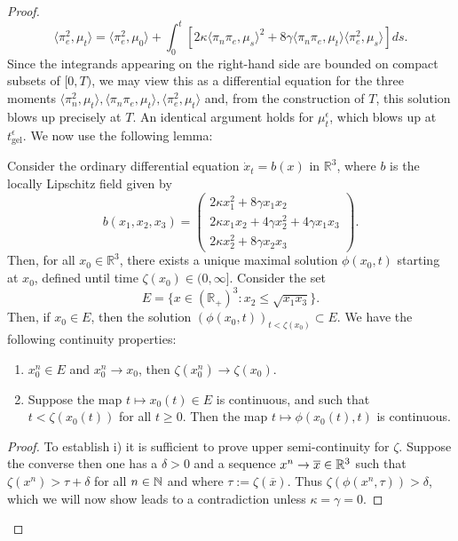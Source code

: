 \begin{proof}
\begin{equation}
    \langle \pi_e^2, \mu_t\rangle =
    \langle \pi_e^2, \mu_0\rangle + \int_0^t \left[2\kappa\langle \pi_n\pi_e, \mu_s\rangle^2+8\gamma\langle \pi_n\pi_e, \mu_t\rangle\langle\pi_e^2, \mu_s \rangle \right] ds.
\end{equation} Since the integrands appearing on the right-hand side are bounded on compact subsets of $[0,T)$, we may view this as a differential equation for the three moments $\langle \pi_n^2, \mu_t\rangle, \langle \pi_n \pi_e, \mu_t\rangle, \langle \pi_e^2, \mu_t\rangle$ and, from the construction of $T$, this solution blows up precisely at $T$. An identical argument holds for $\mu^\epsilon_t$, which blows up at $t^\epsilon_\mathrm{gel}$. We now use the following lemma:
\begin{lemma} Consider the ordinary differential equation $\dot{x}_t=b(x)$ in $\mathbb{R}^3$, where $b$ is the locally Lipschitz field given by \begin{equation} \label{eq: system of ODEs} b(x_1,x_2,x_3)=\begin{pmatrix}2\kappa x_1^2+8\gamma x_1x_2 \\ 2\kappa x_1x_2+4\gamma x_2^2+4\gamma x_1x_3 \\ 2\kappa x_2^2 + 8\gamma x_2x_3 \end{pmatrix}. \end{equation} Then, for all $x_0\in \mathbb{R}^3$, there exists a unique maximal solution $\phi(x_0, t)$ starting at $x_0$, defined until time $\zeta(x_0)\in (0, \infty]$. Consider the set \begin{equation} E=\{x\in (\mathbb{R}_+)^3: x_2\le \sqrt{x_1x_3}\}.\end{equation} Then, if $x_0 \in E$, then the solution $(\phi(x_0,t))_{t<\zeta(x_0)} \subset E$. We have the following continuity properties: \begin{enumerate}[label=\roman{*}).] \item $x^n_0 \in E$ and $x^n_0 \rightarrow x_0$, then $\zeta(x^n_0)\rightarrow \zeta(x_0).$ \item Suppose the map $t\mapsto x_0(t) \in E$ is continuous, and such that $t<\zeta(x_0(t))$ for all $t\ge 0.$ Then the map $t\mapsto \phi(x_0(t), t)$ is continuous.  \end{enumerate} \end{lemma} 

\begin{proof}
To establish i) it is sufficient to prove upper semi-continuity for $\zeta$.
Suppose the converse then one has a $\delta>0$ and a sequence $x^n \rightarrow \overline{x} \in \mathbb{R}^3$ such that
$\zeta(x^n) > \tau + \delta $ for all $n\in \mathbb{N}$ and where $\tau := \zeta(\overline{x})$.
Thus $\zeta\left(\phi(x^n,\tau)\right) > \delta $, which we will now show leads to a contradiction unless $\kappa = \gamma = 0$.


\end{proof}
\end{proof}
